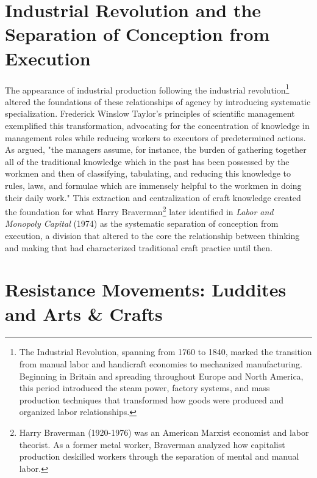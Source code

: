 \section{Industrial Revolution and the Separation of Conception from Execution}

The appearance of industrial production following the industrial revolution\footnote{The Industrial Revolution, spanning from 1760 to 1840, marked the transition from manual labor and handicraft economies to mechanized manufacturing. Beginning in Britain and spreading throughout Europe and North America, this period introduced the steam power, factory systems, and mass production techniques that transformed how goods were produced and organized labor relationships.} altered the foundations of these relationships of agency by introducing systematic specialization. Frederick Winslow Taylor's principles of scientific management exemplified this transformation, advocating for the concentration of knowledge in management roles while reducing workers to executors of predetermined actions. As \citet{taylor1911} argued, "the managers assume, for instance, the burden of gathering together all of the traditional knowledge which in the past has been possessed by the workmen and then of classifying, tabulating, and reducing this knowledge to rules, laws, and formulae which are immensely helpful to the workmen in doing their daily work." This extraction and centralization of craft knowledge created the foundation for what Harry Braverman\footnote{Harry Braverman (1920-1976) was an American Marxist economist and labor theorist. As a former metal worker, Braverman analyzed how capitalist production deskilled workers through the separation of mental and manual labor.} later identified in \textit{Labor and Monopoly Capital} (1974) as the systematic separation of conception from execution, a division that altered to the core the relationship between thinking and making that had characterized traditional craft practice until then.

\section{Resistance Movements: Luddites and Arts \& Crafts}

